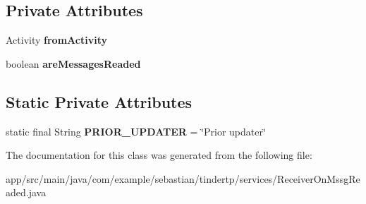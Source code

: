 \subsection*{Private Attributes}
\begin{DoxyCompactItemize}
\item 
Activity {\bfseries from\+Activity}\hypertarget{classcom_1_1example_1_1sebastian_1_1tindertp_1_1services_1_1ReceiverOnMssgReaded_a87bd0c7bd5de05ec1e3e869e0824f01a}{}\label{classcom_1_1example_1_1sebastian_1_1tindertp_1_1services_1_1ReceiverOnMssgReaded_a87bd0c7bd5de05ec1e3e869e0824f01a}

\item 
boolean {\bfseries are\+Messages\+Readed}\hypertarget{classcom_1_1example_1_1sebastian_1_1tindertp_1_1services_1_1ReceiverOnMssgReaded_a7fb038fd1204a888b6642e7d0b451770}{}\label{classcom_1_1example_1_1sebastian_1_1tindertp_1_1services_1_1ReceiverOnMssgReaded_a7fb038fd1204a888b6642e7d0b451770}

\end{DoxyCompactItemize}
\subsection*{Static Private Attributes}
\begin{DoxyCompactItemize}
\item 
static final String {\bfseries P\+R\+I\+O\+R\+\_\+\+U\+P\+D\+A\+T\+ER} = \char`\"{}Prior updater\char`\"{}\hypertarget{classcom_1_1example_1_1sebastian_1_1tindertp_1_1services_1_1ReceiverOnMssgReaded_a1e752012e332558b5be79271b3ee82ea}{}\label{classcom_1_1example_1_1sebastian_1_1tindertp_1_1services_1_1ReceiverOnMssgReaded_a1e752012e332558b5be79271b3ee82ea}

\end{DoxyCompactItemize}


The documentation for this class was generated from the following file\+:\begin{DoxyCompactItemize}
\item 
app/src/main/java/com/example/sebastian/tindertp/services/Receiver\+On\+Mssg\+Readed.\+java\end{DoxyCompactItemize}
